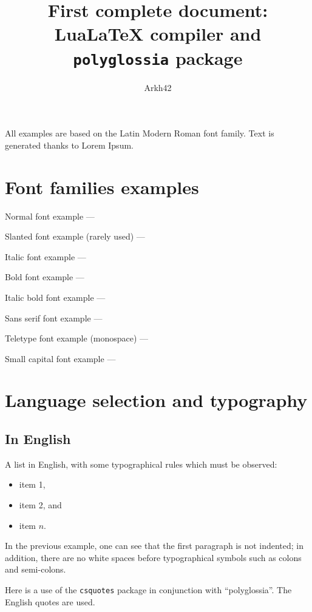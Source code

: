 \documentclass[11pt, a4paper, english]{article}
\author{Arkh42}
\title{First complete document: Lua\LaTeX{} compiler and \texttt{polyglossia} package}
\begin{document}
	
	
	\maketitle


	All examples are based on the Latin Modern Roman font family.
	Text is generated thanks to Lorem Ipsum.
	
	
	\section{Font families examples}
	
		Normal font example --- \lipsum[1]
		
		Slanted font example (rarely used) --- \textsl{\lipsum[1]}
		
		Italic font example --- \textit{\lipsum[1]}
		
		Bold font example --- \textbf{\lipsum[1]}
		
		Italic bold font example --- \textbf{\textit{\lipsum[1]}}
		
		Sans serif font example --- \textsf{\lipsum[1]}
		
		Teletype font example (monospace) --- \texttt{\lipsum[1]}
		
		Small capital font example --- \textsc{\lipsum[1]}
	
	
	\section{Language selection and typography}
	
	
		\subsection{In English}

			A list in English, with some typographical rules which must be observed:
			\begin{itemize}
				\item item 1,
				\item item 2, and
				\item item $n$.
			\end{itemize}
			
			In the previous example, one can see that the first paragraph is not indented; in addition, there are no white spaces before typographical symbols such as colons and semi-colons.
			
			Here is a use of the \texttt{csquotes} package in conjunction with \enquote{polyglossia}. The English quotes are used. 
	
\end{document}

